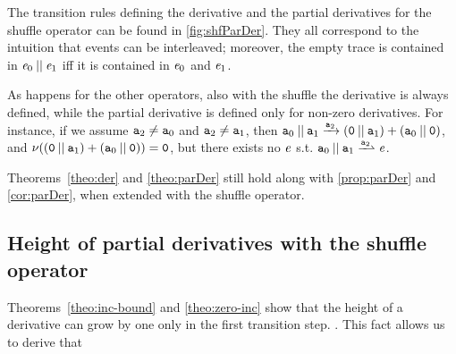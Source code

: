 The transition rules defining the derivative and the partial derivatives for the shuffle operator
can be found in \cref{fig:shfParDer}. They all correspond to the intuition that events can be interleaved; moreover, the empty trace is contained in $\mathit {e}_0\mathbin{||}\mathit {e}_1$ iff it is contained in $\mathit {e}_0$ and $\mathit {e}_1$.

As happens for the other operators, also with the shuffle  the derivative is always defined, while the partial derivative is defined only for non-zero derivatives. For instance, if we assume $\mathtt {a}_2\neq\mathtt {a}_0$ and $\mathtt {a}_2\neq\mathtt {a}_1$, then
$\mathtt {a}_0\mathbin{||} \mathtt {a}_1\xrightarrow{\mathtt {a}_2}(\mathtt {0}\mathbin{||}\mathtt {a}_1)\mathbin{+}(\mathtt {a}_0\mathbin{||}\mathtt {0})$, and $\nu({(\mathtt {0}\mathbin{||}\mathtt {a}_1)\mathbin{+}(\mathtt {a}_0\mathbin{||}\mathtt {0})})=\mathtt {0}$, but there exists no $\mathit {e}$ s.t.
$\sym_0\shuffleop \sym_1\parDer{\sym_2}\re$.

Theorems~\ref{theo:der} and \ref{theo:parDer} still hold along with  \cref{prop:parDer} and \cref{cor:parDer}, when extended with the shuffle operator.

\subsection{Height of partial derivatives with the shuffle operator}

Theorems~\ref{theo:inc-bound} and \ref{theo:zero-inc} show  that the height of a derivative can grow by one only in the first transition
step. . This fact allows us to derive that